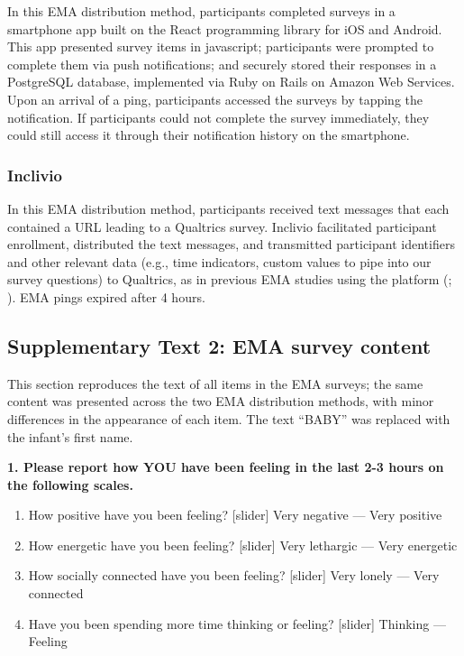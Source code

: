 \documentclass[
]{article}
\providecommand{\tightlist}{%
  \setlength{\itemsep}{0pt}\setlength{\parskip}{0pt}}
\begin{document}
In this EMA distribution method, participants completed surveys in a
smartphone app built on the React programming library for iOS and
Android. This app presented survey items in javascript; participants
were prompted to complete them via push notifications; and securely
stored their responses in a PostgreSQL database, implemented via Ruby on
Rails on Amazon Web Services. Upon an arrival of a ping, participants
accessed the surveys by tapping the notification. If participants could
not complete the survey immediately, they could still access it through
their notification history on the smartphone.

\subsubsection*{Inclivio}\label{inclivio}

In this EMA distribution method, participants received text messages
that each contained a URL leading to a Qualtrics survey. Inclivio
facilitated participant enrollment, distributed the text messages, and
transmitted participant identifiers and other relevant data (e.g., time
indicators, custom values to pipe into our survey questions) to
Qualtrics, as in previous EMA studies using the platform
(;
). EMA pings expired after 4
hours.

\subsection*{Supplementary Text 2: EMA survey
content}\label{supplementary-text-2-ema-survey-content}

This section reproduces the text of all items in the EMA surveys; the
same content was presented across the two EMA distribution methods, with
minor differences in the appearance of each item. The text ``BABY'' was
replaced with the infant's first name.

\textbf{1. Please report how YOU have been feeling in the last 2-3 hours
on the following scales.}

\begin{enumerate}
\def\labelenumi{\alph{enumi}.}
\tightlist
\item
  How positive have you been feeling? {[}slider{]} Very negative ---
  Very positive
\item
  How energetic have you been feeling? {[}slider{]} Very lethargic ---
  Very energetic
\item
  How socially connected have you been feeling? {[}slider{]} Very lonely
  --- Very connected
\item
  Have you been spending more time thinking or feeling? {[}slider{]}
  Thinking --- Feeling
\end{enumerate}
\end{document}
